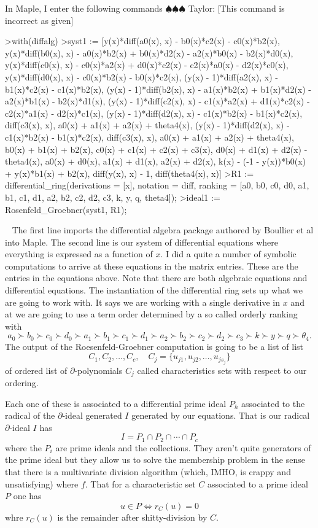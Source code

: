 \documentclass[12pt]{book}
\newcommand{\taylor}[1]{{\color{blue} \sf $\spadesuit\spadesuit\spadesuit$ Taylor: [#1]}}
\numberwithin{equation}{section}
\theoremstyle{definition}
\theoremstyle{remark}
\begin{document}
\noindent In \textsf{Maple}, I enter the following commands
\taylor{This command is incorrect as given}
\begin{spverbatim}
	>with(diffalg)
	>syst1 := [y(x)*diff(a0(x), x) - b0(x)*c2(x) - c0(x)*b2(x), y(x)*diff(b0(x), x) - a0(x)*b2(x) + b0(x)*d2(x) - a2(x)*b0(x) - b2(x)*d0(x), y(x)*diff(c0(x), x) - c0(x)*a2(x) + d0(x)*c2(x) - c2(x)*a0(x) - d2(x)*c0(x), y(x)*diff(d0(x), x) - c0(x)*b2(x) - b0(x)*c2(x), (y(x) - 1)*diff(a2(x), x) - b1(x)*c2(x) - c1(x)*b2(x), (y(x) - 1)*diff(b2(x), x) - a1(x)*b2(x) + b1(x)*d2(x) - a2(x)*b1(x) - b2(x)*d1(x), (y(x) - 1)*diff(c2(x), x) - c1(x)*a2(x) + d1(x)*c2(x) - c2(x)*a1(x) - d2(x)*c1(x), (y(x) - 1)*diff(d2(x), x) - c1(x)*b2(x) - b1(x)*c2(x), diff(c3(x), x), a0(x) + a1(x) + a2(x) + theta4(x), (y(x) - 1)*diff(d2(x), x) - c1(x)*b2(x) - b1(x)*c2(x), diff(c3(x), x), a0(x) + a1(x) + a2(x) + theta4(x), b0(x) + b1(x) + b2(x), c0(x) + c1(x) + c2(x) + c3(x), d0(x) + d1(x) + d2(x) - theta4(x), a0(x) + d0(x), a1(x) + d1(x), a2(x) + d2(x), k(x) - (-1 - y(x))*b0(x) + y(x)*b1(x) + b2(x), diff(y(x), x) - 1, diff(theta4(x), x)]
	>R1 := differential_ring(derivations = [x], notation = diff, ranking = [a0, b0, c0, d0, a1, b1, c1, d1, a2, b2, c2, d2, c3, k, y, q, theta4]);
	>ideal1 := Rosenfeld_Groebner(syst1, R1);
\end{spverbatim}
\ \newline
The first line imports the differential algebra package authored by Boullier et al into \textsf{Maple}. 
The second line is our system of differential equations where everything is expressed as a function of $x$. 
I did a quite a number of symbolic computations to arrive at these equations in the matrix entries. 
These are the entries in the equations above. 
Note that there are both algebraic equations and differential equations. 
The instantiation of the differential ring sets up what we are going to work with. 
It says we are working with a single derivative in $x$ and at we are going to use a term order determined by a so called orderly ranking with 
$$a_0\succ b_0 \succ c_0 \succ d_0 \succ a_1 \succ b_1 \succ c_1 \succ d_1 \succ a_2\succ b_2 \succ c_2 \succ d_2 \succ c_3 \succ  k \succ  y \succ q \succ  \theta_4.$$
The output of the Roesenfeld-Groebner computation is going to be a list of list
$$ C_1, C_2,\ldots, C_c, \quad C_j = \lbrace u_{j1}, u_{j2},\ldots, u_{js_j} \rbrace $$
of ordered list of $\partial$-polynomials $C_j$ called characteristics sets with respect to our ordering.

Each one of these is associated to a differential prime ideal $P_h$ associated to the radical of the $\partial$-ideal generated $I$ generated by our equations.
That is our radical $\partial$-ideal $I$ has 
$$ I = P_1 \cap P_2 \cap \cdots \cap P_c $$
where the $P_i$ are prime ideals and the collections.
They aren't quite generators of the prime ideal but they allow us to solve the membership problem in the sense that there is a multivariate division algorithm (which, IMHO, is crappy and unsatisfying) where $f$. 
That for a characteristic set $C$ associated to a prime ideal $P$ one has 
$$ u\in P \iff r_C(u) =0 $$
whre $r_C(u)$ is the remainder after shitty-division by $C$.
\end{document}

